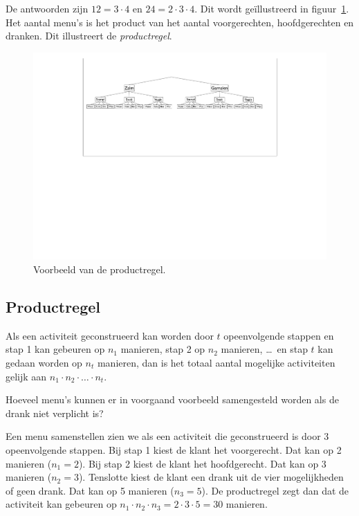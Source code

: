 De antwoorden zijn $12=3\cdot 4$ en $24=2\cdot 3\cdot 4$. Dit wordt geïllustreerd in figuur~\ref{fig:hamburgers}.  Het aantal menu's is het product van het aantal voorgerechten, hoofdgerechten en dranken. Dit illustreert de \emph{productregel}.

\begin{figure}[htbp]
\begin{center}
\includegraphics[width=\textwidth]{figuren/telproblemen/04hamburgers}
\caption{Voorbeeld van de productregel.}
\label{fig:hamburgers}
\end{center}
\end{figure}


\subsection{Productregel}
Als een activiteit geconstrueerd kan worden door $t$ opeenvolgende stappen en stap 1 kan gebeuren op $n_1$ manieren, stap 2 op $n_2$ manieren, \dots\ en stap $t$ kan gedaan worden op $n_t$ manieren, dan is het totaal aantal mogelijke activiteiten gelijk aan $n_1\cdot n_2\cdot \dots\cdot n_t$.

\voorbeeld
Hoeveel menu's kunnen er in voorgaand voorbeeld samengesteld worden als de drank niet verplicht is?

Een menu samenstellen zien we als een activiteit die geconstrueerd is door 3 opeenvolgende stappen. Bij stap 1 kiest de klant het voorgerecht. Dat kan op 2 manieren ($n_1=2$). Bij stap 2 kiest de klant het hoofdgerecht. Dat kan op 3 manieren ($n_2=3$). Tenslotte kiest de klant een drank uit de vier mogelijkheden of geen drank. Dat kan op 5 manieren ($n_3=5$). De productregel zegt dan dat de activiteit kan gebeuren op $n_1\cdot n_2\cdot n_3=2\cdot3\cdot5=30$ manieren.

